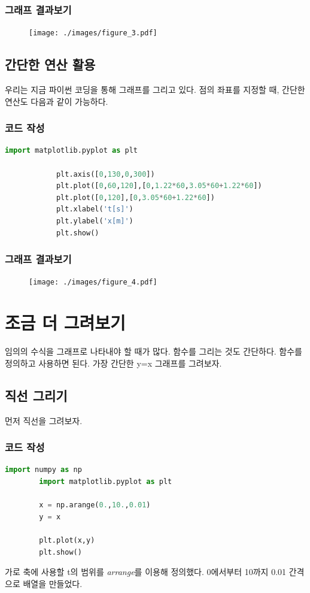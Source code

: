 \documentclass[12pt]{article}
\begin{document}
			\subsubsection{그래프 결과보기}
			\begin{figure}[h]
				\begin{center}
					\texttt{[image: ./images/figure\_3.pdf]}
				\end{center}
			\end{figure}		
		
		\clearpage
		\subsection{간단한 연산 활용}
			우리는 지금 파이썬 코딩을 통해 그래프를 그리고 있다. 점의 좌표를 지정할 때, 간단한 연산도 다음과 같이 가능하다.
			\subsubsection{코드 작성}
			\begin{lstlisting}[style=pstyle, language=Python, caption=simple operation]
			import matplotlib.pyplot as plt
			
			plt.axis([0,130,0,300])
			plt.plot([0,60,120],[0,1.22*60,3.05*60+1.22*60])
			plt.plot([0,120],[0,3.05*60+1.22*60])
			plt.xlabel('t[s]')
			plt.ylabel('x[m]')
			plt.show()\end{lstlisting}
			\subsubsection{그래프 결과보기}
			\begin{figure}[h]
				\begin{center}
					\texttt{[image: ./images/figure\_4.pdf]}
				\end{center}
			\end{figure}
		
	\section{조금 더 그려보기}
		임의의 수식을 그래프로 나타내야 할 때가 많다. 함수를 그리는 것도 간단하다. 함수를 정의하고 사용하면 된다. 가장 간단한 y=x 그래프를 그려보자. 
		\subsection{직선 그리기}
		먼저 직선을 그려보자.
		\subsubsection{코드 작성}
		\begin{lstlisting}[style=pstyle, language=Python, caption=linear function]
		import numpy as np
		import matplotlib.pyplot as plt
		
		x = np.arange(0.,10.,0.01)
		y = x
		
		plt.plot(x,y)
		plt.show()\end{lstlisting}
		가로 축에 사용할 t의 범위를 \textit{arrange}를 이용해 정의했다. 0에서부터 10까지 0.01 간격으로 배열을 만들었다. 
		
\end{document}
